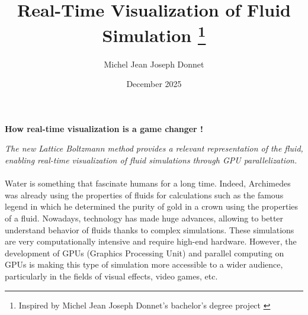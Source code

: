 \documentclass{article}
\title{Real-Time Visualization of Fluid Simulation \footnote{Inspired by Michel Jean Joseph Donnet's bachelor's degree project \cite{donnetComparaisonEntreMethodes}}}
\author{Michel Jean Joseph Donnet}
\date{December 2025}
\begin{document}
\maketitle


\begin{center}
    \textbf{How real-time visualization is a game changer !}
\end{center}


\begin{center}
    \textit{The new Lattice Boltzmann method provides a relevant representation of the fluid, enabling real-time visualization of fluid simulations through GPU parallelization.
}
\end{center}

\paragraph{}{
Water is something that fascinate humans for a long time.
Indeed, Archimedes was already using the properties of fluids for calculations such as the famous legend in which he determined the purity of gold in a crown using the properties of a fluid.
Nowadays, technology has made huge advances, allowing to better understand behavior of fluids thanks to complex simulations.
These simulations are very computationally intensive and require high-end hardware.
However, the development of GPUs (Graphics Processing Unit) and parallel computing on GPUs is making this type of simulation more accessible to a wider audience, particularly in the fields of visual effects, video games, etc.
}

\end{document}
